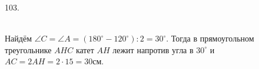 103. \begin{figure}[ht!]
\end{figure}\\
Найдём $\angle C=\angle A=(180^\circ-120^\circ):2=30^\circ.$ Тогда в прямоугольном треугольнике $AHC$ катет $AH$ лежит напротив угла в $30^\circ$ и $AC=2AH=2\cdot15=30$см.\newpage\noindent
